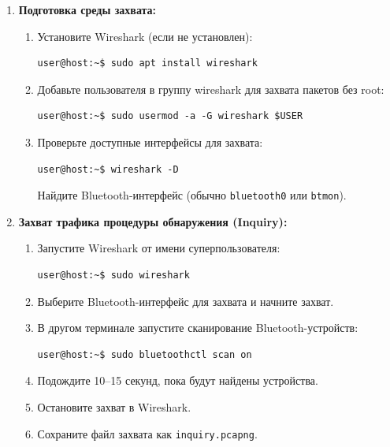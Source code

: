\begin{enumerate}[nosep, leftmargin=*]
    \item \textbf{Подготовка среды захвата:}
    \begin{enumerate}[label=\alph*), nosep]
        \item Установите Wireshark (если не установлен):
        \begin{lstlisting}
user@host:~$ sudo apt install wireshark
        \end{lstlisting}
        \item Добавьте пользователя в группу wireshark для захвата пакетов без root:
        \begin{lstlisting}
user@host:~$ sudo usermod -a -G wireshark $USER
        \end{lstlisting}
        \item Проверьте доступные интерфейсы для захвата:
        \begin{lstlisting}
user@host:~$ wireshark -D
        \end{lstlisting}
        Найдите Bluetooth-интерфейс (обычно \texttt{bluetooth0} или \texttt{btmon}).
    \end{enumerate}

    \item \textbf{Захват трафика процедуры обнаружения (Inquiry):}
    \begin{enumerate}[label=\alph*), nosep]
        \item Запустите Wireshark от имени суперпользователя:
        \begin{lstlisting}
user@host:~$ sudo wireshark
        \end{lstlisting}
        \item Выберите Bluetooth-интерфейс для захвата и начните захват.
        \item В другом терминале запустите сканирование Bluetooth-устройств:
        \begin{lstlisting}
user@host:~$ sudo bluetoothctl scan on
        \end{lstlisting}
        \item Подождите 10–15 секунд, пока будут найдены устройства.
        \item Остановите захват в Wireshark.
        \item Сохраните файл захвата как \texttt{inquiry.pcapng}.
    \end{enumerate}


\end{enumerate}
